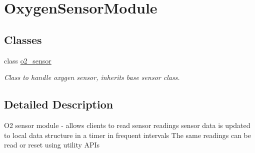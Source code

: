 \hypertarget{group___oxygen_sensor_module}{}\section{Oxygen\+Sensor\+Module}
\label{group___oxygen_sensor_module}
\subsection*{Classes}
\begin{DoxyCompactItemize}
\item 
class \hyperlink{classo2__sensor}{o2\+\_\+sensor}
\begin{DoxyCompactList}\small\item\em Class to handle oxygen sensor, inherits base sensor class. \end{DoxyCompactList}\end{DoxyCompactItemize}


\subsection{Detailed Description}
O2 sensor module -\/ allows clients to read sensor readings sensor data is updated to local data structure in a timer in frequent intervals The same readings can be read or reset using utility A\+P\+Is 